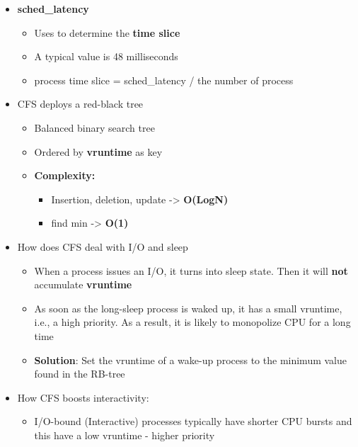 \documentclass[a4paper,11pt,english]{article}
\begin{document}
\begin{itemize}
\begin{itemize}
        \end{itemize}
    \item \textbf{\color{red} sched\_latency}
        \begin{itemize}
            \item Uses to determine the \textbf{\color{blue} time slice}
            \item A typical value is 48 milliseconds
            \item process time slice = sched\_latency / the number of process
        \end{itemize}
    \item CFS deploys a red-black tree
        \begin{itemize}
            \item Balanced binary search tree
            \item Ordered by \textbf{\color{blue} vruntime} as key
            \item \textbf{\color{blue} Complexity:}
                \begin{itemize}
                    \item Insertion, deletion, update -> \textbf{\color{blue} O(LogN)}
                    \item find min -> \textbf{\color{blue} O(1)}
                \end{itemize}
        \end{itemize}
    \item How does CFS deal with I/O and sleep
        \begin{itemize}
            \item When a process issues an I/O, it turns into sleep state. Then it will \textbf{\color{red} not} accumulate \textbf{\color{blue} vruntime}  
            \item As soon as the long-sleep process is waked up, it has a small vruntime, i.e., a high priority. As a result, it is likely to monopolize CPU for a long time
            \item \textbf{\color{blue} Solution}: Set the vruntime of a wake-up process to the minimum value found in the RB-tree
        \end{itemize}
    \item How CFS boosts interactivity:
        \begin{itemize}
            \item I/O-bound (Interactive) processes typically have shorter CPU bursts and this have a low vruntime - higher priority
        \end{itemize}
\end{itemize}
\end{document}
